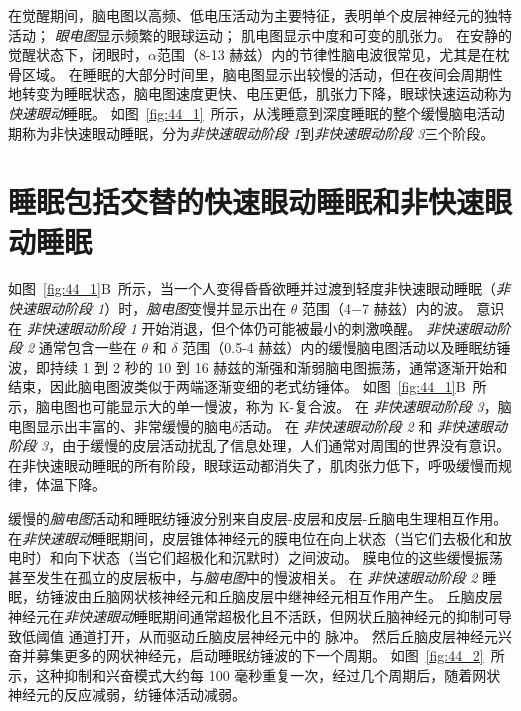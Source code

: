 在觉醒期间，脑电图以高频、低电压活动为主要特征，表明单个皮层神经元的独特活动；
\textit{眼电图}显示频繁的眼球运动；
肌电图显示中度和可变的肌张力。
在安静的觉醒状态下，闭眼时，$ \alpha $范围（8-13 赫兹）内的节律性脑电波很常见，尤其是在枕骨区域。
在睡眠的大部分时间里，脑电图显示出较慢的活动，但在夜间会周期性地转变为睡眠状态，脑电图速度更快、电压更低，肌张力下降，眼球快速运动称为\textit{快速眼动}睡眠。
如图~\ref{fig:44_1}~所示，从浅睡意到深度睡眠的整个缓慢脑电活动期称为非快速眼动睡眠，分为\textit{非快速眼动阶段 1}到\textit{非快速眼动阶段 3}三个阶段。



\section{睡眠包括交替的快速眼动睡眠和非快速眼动睡眠}

如图~\ref{fig:44_1}B~所示，当一个人变得昏昏欲睡并过渡到轻度非快速眼动睡眠（\textit{非快速眼动阶段 1}）时，\textit{脑电图}变慢并显示出在 $ \theta $ 范围（4−7 赫兹）内的波。
意识在 \textit{非快速眼动阶段 1} 开始消退，但个体仍可能被最小的刺激唤醒。
\textit{非快速眼动阶段 2} 通常包含一些在 $ \theta $ 和 $ \delta $ 范围（0.5-4 赫兹）内的缓慢脑电图活动以及睡眠纺锤波，即持续 1 到 2 秒的 10 到 16 赫兹的渐强和渐弱脑电图振荡，通常逐渐开始和结束，因此脑电图波类似于两端逐渐变细的老式纺锤体。
如图~\ref{fig:44_1}B~所示，脑电图也可能显示大的单一慢波，称为 K-复合波。
在 \textit{非快速眼动阶段 3}，脑电图显示出丰富的、非常缓慢的脑电$\delta$活动。
在 \textit{非快速眼动阶段 2} 和 \textit{非快速眼动阶段 3}，由于缓慢的皮层活动扰乱了信息处理，人们通常对周围的世界没有意识。
在非快速眼动睡眠的所有阶段，眼球运动都消失了，肌肉张力低下，呼吸缓慢而规律，体温下降。


缓慢的\textit{脑电图}活动和睡眠纺锤波分别来自皮层-皮层和皮层-丘脑电生理相互作用。
在\textit{非快速眼动}睡眠期间，皮层锥体神经元的膜电位在向上状态（当它们去极化和放电时）和向下状态（当它们超极化和沉默时）之间波动。
膜电位的这些缓慢振荡甚至发生在孤立的皮层板中，与\textit{脑电图}中的慢波相关。
在 \textit{非快速眼动阶段 2} 睡眠，纺锤波由丘脑网状核神经元和丘脑皮层中继神经元相互作用产生。
丘脑皮层神经元在\textit{非快速眼动}睡眠期间通常超极化且不活跃，但网状丘脑神经元的抑制可导致低阈值  通道打开，从而驱动丘脑皮层神经元中的  脉冲。
然后丘脑皮层神经元兴奋并募集更多的网状神经元，启动睡眠纺锤波的下一个周期。
如图~\ref{fig:44_2}~所示，这种抑制和兴奋模式大约每 100 毫秒重复一次，经过几个周期后，随着网状神经元的反应减弱，纺锤体活动减弱。


